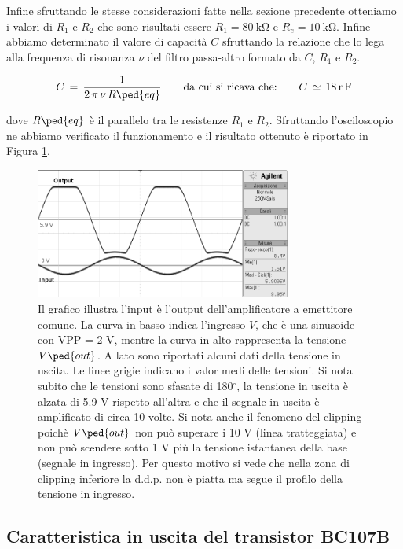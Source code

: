 Infine sfruttando le stesse considerazioni fatte nella sezione precedente otteniamo i valori di $R_1$ e $R_2$ che sono risultati essere $R_1=\SI{80}{\kilo\ohm}$ e $R_e=\SI{10}{\kilo\ohm}$.
Infine abbiamo determinato il valore di capacità $C$ sfruttando la relazione che lo lega alla frequenza di risonanza $\nu$ del filtro passa-altro formato da $C$, $R_1$ e $R_2$.

\begin{equation}
	C \,=\, \frac{1}{2\,\pi\,\nu\,R\ped{eq}} \qquad\text{da cui si ricava che:}\qquad C \,\simeq\,\SI{18}{\nano\farad}
\end{equation}

dove $R\ped{eq}$ è il parallelo tra le resistenze $R_1$ e $R_2$.
Sfruttando l'osciloscopio ne abbiamo verificato il funzionamento e il risultato ottenuto è riportato in Figura \ref{fig:amp}.

\begin{figure}[t!]
	\centering
	\includegraphics[width=0.75\textwidth]{g.png}
	\caption{Il grafico illustra l'input è l'output dell'amplificatore a emettitore comune. La curva in basso indica l'ingresso $V$,
		che è una sinusoide con VPP = 2 V, mentre la curva in alto rappresenta la tensione $V\ped{out}$. A lato sono riportati alcuni dati della tensione in uscita.
		Le linee grigie indicano i valor medi delle tensioni. Si nota subito che le tensioni sono
		sfasate di 180$^\circ$, la tensione in uscita è alzata di 5.9 V rispetto all'altra e che il segnale in uscita è amplificato di circa 10 volte.
		Si nota anche il fenomeno del clipping poichè $V\ped{out}$ non può superare i 10 V (linea tratteggiata) e non può scendere sotto 1 V più
		la tensione istantanea della base (segnale in ingresso). Per questo motivo si vede che nella zona di clipping inferiore la d.d.p.
		non è piatta ma segue il profilo della tensione in ingresso.}
	\label{fig:amp}
\end{figure}

\subsection*{Caratteristica in uscita del transistor BC107B}

